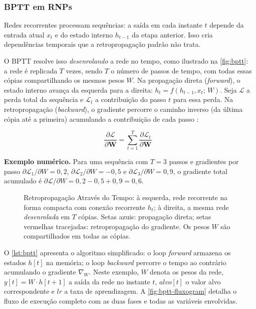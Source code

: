 		\subsubsection{\ac{BPTT} em RNPs}

			\par Redes recorrentes processam sequências: a saída em cada instante $t$ depende da entrada atual $x_t$ e do estado interno $h_{t-1}$ da etapa anterior. Isso cria dependências temporais que a retropropagação padrão não trata.

			\par O BPTT resolve isso \textit{desenrolando} a rede no tempo, como ilustrado na \autoref{fig:bptt}: a rede é replicada $T$ vezes, sendo $T$ o número de passos de tempo, com  todas essas cópias compartilhando os mesmos pesos $W$. Na propagação direta (\textit{forward}), o estado interno avança da esquerda para a direita: $h_t = f(h_{t-1}, x_t;\, W)$. Seja $\mathcal{L}$ a perda total da sequência e $\mathcal{L}_t$ a contribuição do passo $t$ para essa perda. Na retropropagação (\textit{backward}), o gradiente percorre o caminho inverso (da última cópia até a primeira) acumulando a contribuição de cada passo \cite{10242251}:

			\begin{equation}
				\frac{\partial \mathcal{L}}{\partial \mathbf{W}} = \sum_{t=1}^{T} \frac{\partial \mathcal{L}_t}{\partial \mathbf{W}}
			\end{equation}
			\par \textbf{Exemplo numérico.} Para uma sequência com $T=3$ passos e gradientes por passo $\partial\mathcal{L}_1/\partial W=0{,}2$, $\partial\mathcal{L}_2/\partial W=-0{,}5$ e $\partial\mathcal{L}_3/\partial W=0{,}9$, o gradiente total acumulado é $\partial\mathcal{L}/\partial W = 0{,}2-0{,}5+0{,}9 = 0{,}6$.
			
			\begin{figure}[H]
				\centering
				\caption[Retropropagação Através do Tempo (BPTT)]{Retropropagação Através do Tempo: à esquerda, rede recorrente na forma compacta com conexão recorrente $h_t$; à direita, a mesma rede \textit{desenrolada} em $T$ cópias. Setas azuis: propagação direta; setas vermelhas tracejadas: retropropagação do gradiente. Os pesos $W$ são compartilhados em todas as cópias.}
				\resizebox{\linewidth}{!}{}
				\label{fig:bptt}
			\end{figure}

			\par O \autoref{lst:bptt} apresenta o algoritmo simplificado: o loop \textit{forward} armazena os estados $h[t]$ na memória; o loop \textit{backward} percorre o tempo ao contrário acumulando o gradiente $\nabla_W$. Neste exemplo, $W$ denota os pesos da rede, $y[t] = W \cdot h[t{+}1]$ a saída da rede no instante $t$, $\mathit{alvo}[t]$ o valor alvo correspondente e $\mathit{lr}$ a taxa de aprendizagem. A \autoref{fig:bptt-fluxogram} detalha o fluxo de execução completo com as duas fases e todas as variáveis envolvidas.

